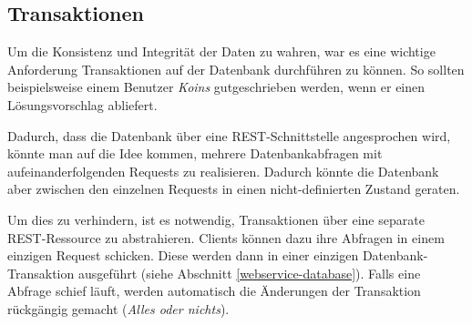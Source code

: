\subsection{Transaktionen}
Um die Konsistenz und Integrität der Daten zu wahren, war es eine wichtige Anforderung Transaktionen auf der Datenbank durchführen zu können.
So sollten beispielsweise einem Benutzer \emph{Koins} gutgeschrieben werden, wenn er einen Lösungsvorschlag abliefert.

Dadurch, dass die Datenbank über eine \gls{REST}-Schnittstelle angesprochen wird, könnte man auf die Idee kommen, mehrere Datenbankabfragen mit aufeinanderfolgenden Requests zu realisieren.
Dadurch könnte die Datenbank aber zwischen den einzelnen Requests in einen nicht-definierten Zustand geraten.

Um dies zu verhindern, ist es notwendig, Transaktionen über eine separate \gls{REST}-Ressource zu abstrahieren.
Clients können dazu ihre Abfragen in einem einzigen Request schicken. Diese werden dann in einer einzigen Datenbank-Transaktion ausgeführt (siehe Abschnitt \ref{webservice-database}).
Falls eine Abfrage schief läuft, werden automatisch die Änderungen der Transaktion rückgängig gemacht (\emph{Alles oder nichts}).